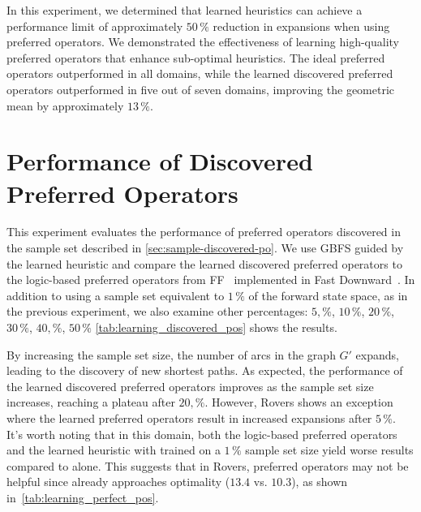 \documentclass[ppgc,diss,english]{iiufrgs}
\begin{document}
In this experiment, we determined that learned heuristics can achieve a performance limit of approximately $50\,\%$ reduction in expansions when using preferred operators. We demonstrated the effectiveness of learning high-quality preferred operators that enhance sub-optimal heuristics. The ideal preferred operators \postar outperformed \hnn in all domains, while the learned discovered preferred operators \pog outperformed \hnn in five out of seven domains, improving the geometric mean by approximately $13\,\%$.

\section{Performance of Discovered Preferred Operators}
\label{sec:exp-performance-po}
This experiment evaluates the performance of preferred operators discovered in the sample set described in \cref{sec:sample-discovered-po}. We use GBFS guided by the learned heuristic \hnn and compare the learned discovered preferred operators \pog to the logic-based preferred operators \poff from FF~\cite{Hoffmann.Nebel/2001} implemented in Fast Downward~\cite{Helmert/2006}. In addition to using a sample set equivalent to $1\,\%$ of the forward state space, as in the previous experiment, we also examine other percentages: $5,\%$, $10\,\%$, $20\,\%$, $30\,\%$, $40,\%$, $50\,\%$ \cref{tab:learning_discovered_pos} shows the results.



By increasing the sample set size, the number of arcs in the graph $G'$ expands, leading to the discovery of new shortest paths. As expected, the performance of the learned discovered preferred operators \pog improves as the sample set size increases, reaching a plateau after $20,\%$. However, Rovers shows an exception where the learned preferred operators result in increased expansions after $5\,\%$. It's worth noting that in this domain, both the logic-based preferred operators \poff and the learned heuristic \hnn with \pog trained on a $1\,\%$ sample set size yield worse results compared to \hnn alone. This suggests that in Rovers, preferred operators may not be helpful since \hnn already approaches optimality ($13.4$ vs. $10.3$), as shown in~\cref{tab:learning_perfect_pos}.
\end{document}
